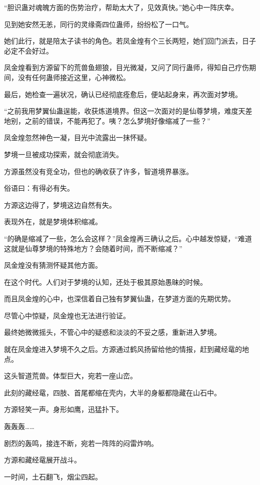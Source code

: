 \begin{this_body}
“胆识蛊对魂魄方面的伤势治疗，帮助太大了，见效真快。”她心中一阵庆幸。

见到她安然无恙，同行的灵缘斋四位蛊师，纷纷松了一口气。

她们此行，就是陪太子读书的角色。若凤金煌有个三长两短，她们回门派去，日子必定不会好过。

凤金煌看到方源留下的荒兽鱼翅狼，目光微凝，又问了同行蛊师，得知自己疗伤期间，没有任何蛊师接近这里，心神微松。

最后，她检查一遍状况，确认已经彻底痊愈后，便站起身来，再次面对梦境。

“之前我用梦翼仙蛊逞能，收获炼道境界。但这一次面对的是仙尊梦境，难度天差地别，之前的错误，不能再犯了。咦？怎么梦境好像缩减了一些？”

凤金煌忽然神色一凝，目光中流露出一抹怀疑。

梦境一旦被成功探索，就会彻底消失。

方源虽然没有竞全功，但也的确收获了许多，智道境界暴涨。

俗语曰：有得必有失。

方源这边得了，梦境这边自然有失。

表现外在，就是梦境体积缩减。

“的确是缩减了一些，怎么会这样？”凤金煌再三确认之后。心中越发惊疑，“难道这就是仙尊梦境的特殊地方？会随着时间，而不断缩减？”

凤金煌没有猜测怀疑其他方面。

在这个时代。人们对于梦境的认知，还处于极其原始愚昧的时候。

而且凤金煌的心中，也深信着自己独有梦翼仙蛊，在梦道方面的先期优势。

尽管心中惊疑，凤金煌也无法进行验证。

最终她微微摇头，不管心中的疑惑和淡淡的不妥之感，重新进入梦境。

就在凤金煌进入梦境不久之后。方源通过鹤风扬留给他的情报，赶到藏经鼋的地点。

这头智道荒兽。体型巨大，宛若一座山峦。

此刻的藏经鼋，四肢、首尾都缩在壳内，大半的身躯都隐藏在山石中。

方源轻笑一声。身形如鹰，迅猛扑下。

轰轰轰……

剧烈的轰鸣，接连不断，宛若一阵阵的闷雷炸响。

方源和藏经鼋展开战斗。

一时间，土石翻飞，烟尘四起。


\end{this_body}
